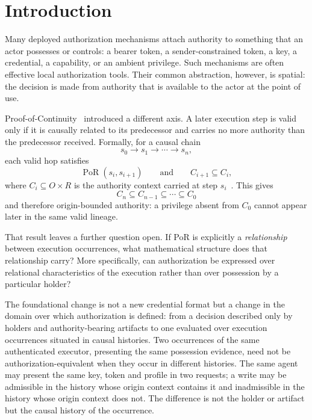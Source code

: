 \documentclass[10pt,twocolumn]{article}
\newcommand{\PoR}{\operatorname{PoR}}
\begin{document}
\begin{abstract}
Finally, we prove that the executor-dependent decision factors through the
relational profile and is invariant under sound mechanisms that establish the
same profile. Successor-side PoP is therefore a possible evidence mechanism,
not a necessary semantic premise of authorization. Conditional on explicit
Witness Assumptions, a boundary-witnessed checkpoint construction realizes the
premises without successor-side PoP. Boundary signatures provide checkpoint
evidence, profile evidence may rely on additional trust roots, and the
construction does not independently establish its environmental assumptions.
\end{abstract}

\section{Introduction}

Many deployed authorization mechanisms attach authority to something that an
actor possesses or controls: a bearer token, a sender-constrained token, a key,
a credential, a capability, or an ambient privilege. Such mechanisms are often
effective local authorization tools. Their common abstraction, however, is
spatial: the decision is made from authority that is available to the actor at
the point of use.

Proof-of-Continuity~\cite{gallo2026poc} introduced a different axis. A later execution step is valid
only if it is causally related to its predecessor and carries no more authority
than the predecessor received. Formally, for a causal chain
\[
s_0 \rightarrow s_1 \rightarrow \cdots \rightarrow s_n,
\]
each valid hop satisfies
\[
\PoR(s_i,s_{i+1})
\qquad\text{and}\qquad
C_{i+1}\subseteq C_i,
\]
where \(C_i\subseteq O\times R\) is the authority context carried at step
\(s_i\)~\cite{gallo2026poc}. This gives
\[
C_n\subseteq C_{n-1}\subseteq\cdots\subseteq C_0
\]
and therefore origin-bounded authority: a privilege absent from \(C_0\) cannot
appear later in the same valid lineage.

That result leaves a further question open. If PoR is explicitly a
\emph{relationship} between execution occurrences, what mathematical structure
does that relationship carry? More specifically, can authorization be expressed
over relational characteristics of the execution rather than over possession by
a particular holder?

The foundational change is not a new credential format but a change in the
domain over which authorization is defined: from a decision described only by
holders and authority-bearing artifacts to one evaluated over execution
occurrences situated in causal histories. Two occurrences of the same
authenticated executor, presenting the same possession evidence, need not be
authorization-equivalent when they occur in different histories. The same
agent may present the same key, token and profile in two requests; a write may
be admissible in the history whose origin context contains it and inadmissible
in the history whose origin context does not. The difference is not the holder
or artifact but the causal history of the occurrence.
\end{document}
